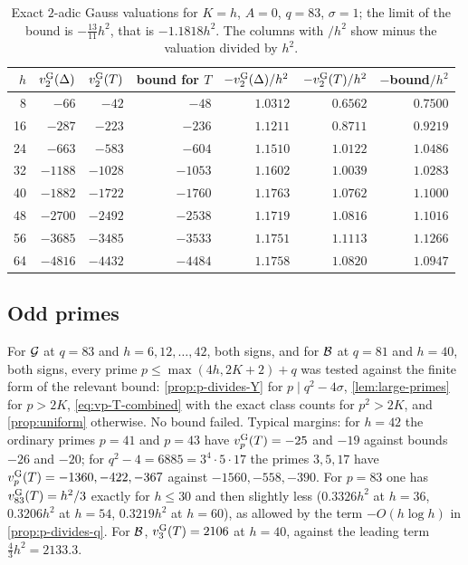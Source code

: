 \begin{table}[ht]
\centering
\caption{Exact $2$-adic Gauss valuations for $K=h$, $A=0$, $q=83$, $\sigma=1$; the limit of the
bound is $-\frac{13}{11}h^2$, that is $-1.1818h^2$. The columns with $/h^2$ show minus the
valuation divided by $h^2$.}\label{tab:two-adic-square}
\begin{tabular}{@{}rrrrrrr@{}}
\toprule
$h$ & $v_{2}^{\mathrm{G}}(\Delta)$ & $v_{2}^{\mathrm{G}}(T)$ & bound for $T$ & $-v_{2}^{\mathrm{G}}(\Delta)/h^2$ & $-v_{2}^{\mathrm{G}}(T)/h^2$ & $-$bound$/h^2$\\
\midrule
8 & $-66$ & $-42$ & $-48$ & $1.0312$ & $0.6562$ & $0.7500$\\
16 & $-287$ & $-223$ & $-236$ & $1.1211$ & $0.8711$ & $0.9219$\\
24 & $-663$ & $-583$ & $-604$ & $1.1510$ & $1.0122$ & $1.0486$\\
32 & $-1188$ & $-1028$ & $-1053$ & $1.1602$ & $1.0039$ & $1.0283$\\
40 & $-1882$ & $-1722$ & $-1760$ & $1.1763$ & $1.0762$ & $1.1000$\\
48 & $-2700$ & $-2492$ & $-2538$ & $1.1719$ & $1.0816$ & $1.1016$\\
56 & $-3685$ & $-3485$ & $-3533$ & $1.1751$ & $1.1113$ & $1.1266$\\
64 & $-4816$ & $-4432$ & $-4484$ & $1.1758$ & $1.0820$ & $1.0947$\\
\bottomrule
\end{tabular}
\end{table}

\subsection{Odd primes}
For $\mathcal{G}$ at $q=83$ and $h=6,12,\dots,42$, both signs, and for $\mathcal{B}$ at $q=81$ and $h=40$, both
signs, every prime $p\le\max(4h,2K+2)+q$ was tested against the finite form of the relevant
bound: \cref{prop:p-divides-Y} for $p\mid q^2-4\sigma$, \cref{lem:large-primes} for $p>2K$,
\eqref{eq:vp-T-combined} with the exact class counts for $p^2>2K$, and \cref{prop:uniform}
otherwise. No bound failed. Typical margins: for $h=42$ the ordinary primes $p=41$ and $p=43$
have $v_{p}^{\mathrm{G}}(T)=-25$ and $-19$ against bounds $-26$ and $-20$; for $q^2-4=6885=3^4\cdot5\cdot17$ the
primes $3,5,17$ have $v_{p}^{\mathrm{G}}(T)=-1360,-422,-367$ against $-1560,-558,-390$. For $p=83$ one has
$v_{83}^{\mathrm{G}}(T)=h^2/3$ exactly for $h\le30$ and then slightly less ($0.3326h^2$ at $h=36$, $0.3206h^2$
at $h=54$, $0.3219h^2$ at $h=60$), as allowed by the term $-O(h\log h)$ in
\cref{prop:p-divides-q}. For $\mathcal{B}$, $v_{3}^{\mathrm{G}}(T)=2106$ at $h=40$, against the leading term
$\frac43h^2=2133.3$.

